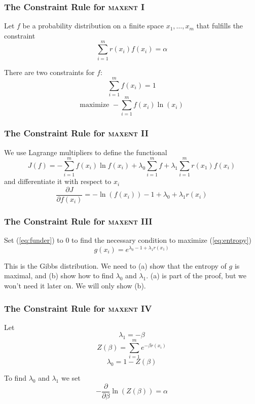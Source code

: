 \documentclass[xcolor=dvipsnames]{beamer}
\begin{document}
\begin{frame}
  \frametitle{The Constraint Rule for \textsc{maxent} I}
Let $f$ be a probability distribution on a finite space
$x_{1},\ldots,x_{m}$ that fulfills the constraint
\begin{equation}
  \label{eq:constraint}
\sum_{i=1}^{m}r(x_{i})f(x_{i})=\alpha
\end{equation}

There are two constraints for $f$:
\begin{equation}
  \label{eq:unity}
\sum_{i=1}^{m}f(x_{i})=1
\end{equation}
\begin{equation}
  \label{eq:entropy}
\mbox{maximize }-\sum_{i=1}^{m}f(x_{i})\ln(x_{i})
\end{equation}
\end{frame}

\begin{frame}
  \frametitle{The Constraint Rule for \textsc{maxent} II}
We use Lagrange multipliers to define the functional
\begin{equation}
  \label{eq:functional}
J(f)=-\sum_{i=1}^{m}f(x_{i})\ln{}f(x_{i})+\lambda_{0}\sum_{i=1}^{m}f+\lambda_{1}\sum_{i=1}^{m}r(x_{1})f(x_{i})
\end{equation}
and differentiate it with respect to $x_{i}$
\begin{equation}
  \label{eq:funder}
\frac{\partial{}J}{\partial{}f(x_{i})}=-\ln(f(x_{i}))-1+\lambda_{0}+\lambda_{1}r(x_{i})
\end{equation}
\end{frame}


\begin{frame}
  \frametitle{The Constraint Rule for \textsc{maxent} III}
Set ({\ref{eq:funder}}) to $0$ to find the necessary condition to
maximize ({\ref{eq:entropy}})
\begin{equation}
  \label{eq:coverthomas}
g(x_{i})=e^{\lambda_{0}-1+\lambda_{1}r(x_{1})}
\end{equation}

This is the Gibbs distribution. We need to (a) show that the entropy
of $g$ is maximal, and (b) show how to find $\lambda_{0}$ and
$\lambda_{1}$. (a) is part of the proof, but we won't need it later
on. We will only show (b). 
\end{frame}

\begin{frame}
  \frametitle{The Constraint Rule for \textsc{maxent} IV}
  Let
  \begin{equation}
  \label{eq:l1}
\lambda_{1}=-\beta
\end{equation}
\begin{equation}
  \label{eq:zet}
Z(\beta)=\sum_{i=1}^{m}e^{-\beta{}r(x_{i})}
\end{equation}
\begin{equation}
  \label{eq:l0}
\lambda_{0}=1-Z(\beta)
\end{equation}

To find $\lambda_{0}$ and $\lambda_{1}$ we set
\begin{equation}
  \label{eq:logcon}
-\frac{\partial}{\partial{}\beta}\ln(Z(\beta))=\alpha
\end{equation}
\end{frame}
\end{document}
